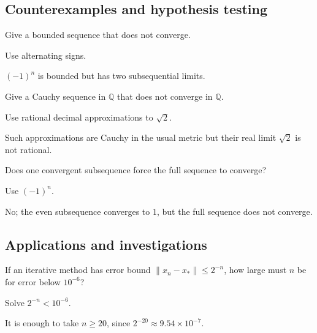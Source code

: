 \subsection*{Counterexamples and hypothesis testing}

\begin{exercise}\label{exr:ii03-expand-10}
Give a bounded sequence that does not converge.
\end{exercise}
\begin{hint}
Use alternating signs.
\end{hint}
\begin{solution}
\((-1)^n\) is bounded but has two subsequential limits.
\end{solution}

\begin{exercise}\label{exr:ii03-expand-11}
Give a Cauchy sequence in \(\mathbb Q\) that does not converge in \(\mathbb Q\).
\end{exercise}
\begin{hint}
Use rational decimal approximations to \(\sqrt2\).
\end{hint}
\begin{solution}
Such approximations are Cauchy in the usual metric but their real limit \(\sqrt2\) is not rational.
\end{solution}

\begin{exercise}\label{exr:ii03-expand-12}
Does one convergent subsequence force the full sequence to converge?
\end{exercise}
\begin{hint}
Use \((-1)^n\).
\end{hint}
\begin{solution}
No; the even subsequence converges to \(1\), but the full sequence does not converge.
\end{solution}

\subsection*{Applications and investigations}

\begin{exercise}\label{exr:ii03-expand-13}
If an iterative method has error bound \(\|x_n-x_*\|\le2^{-n}\), how large must \(n\) be for error below \(10^{-6}\)?
\end{exercise}
\begin{hint}
Solve \(2^{-n}<10^{-6}\).
\end{hint}
\begin{solution}
It is enough to take \(n\ge20\), since \(2^{-20}\approx9.54\times10^{-7}\).
\end{solution}

